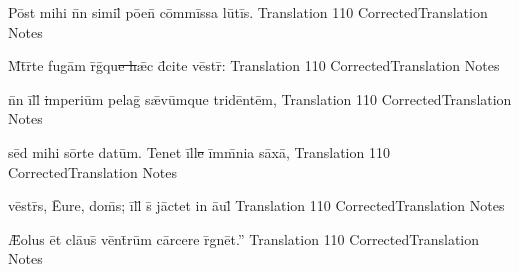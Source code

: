 \latline
  {P\=ost m\-ih\-i n\={}n s\-im\-il\={\macron {\i}} p\={oe}n\={} c\=omm\=iss\-a l\-u\={}t\=is.}
  { Translation }
  {110}
  { CorrectedTranslation }
  { Notes }


\latline
  {M\={}t\={}r\={}t\-e f\-ug\=am r\={}g\={\macron {\i}}qu\sout{e h}\={\ae}c d\={\macron {\i}}c\-it\-e v\=estr\={}:}
  { Translation }
  {110}
  { CorrectedTranslation }
  { Notes }


\latline
  {n\={}n \=ill\={\macron {\i}}\sout{ i}mp\-er\-i\=um p\-el\-ag\={\macron {\i}} s\={\ae}v\=umqu\-e tr\-id\=ent\=em,}
  { Translation }
  {110}
  { CorrectedTranslation }
  { Notes }





\latline
  {s\=ed m\-ih\-i s\=ort\-e d\-at\=um.  T\-en\-et \=ill\sout{e }\=imm\={}n\-i\-a s\=ax\=a,}
  { Translation }
  {110}
  { CorrectedTranslation }
  { Notes }


\latline
  {v\=estr\={}s, \={Eu}r\-e, d\-om\={}s; \=ill\={} s\={} j\=act\-et \-in \={au}l\={}}
  { Translation }
  {110}
  { CorrectedTranslation }
  { Notes }


\latline
  {\={\AE}\-ol\-us \=et cl\={au}s\={} v\=ent\={}r\=um c\=arc\-er\-e r\={}gn\=et.''}
  { Translation }
  {110}
  { CorrectedTranslation }
  { Notes }